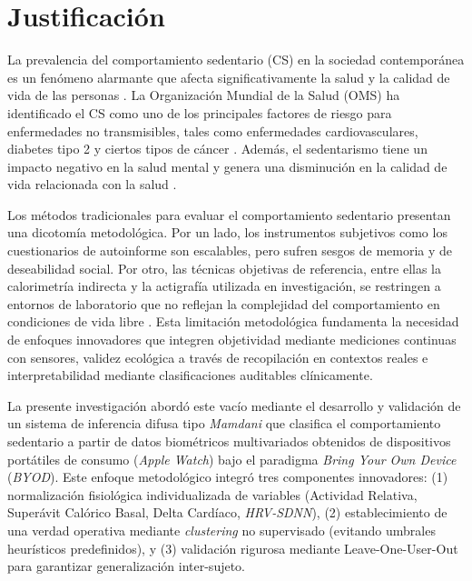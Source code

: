 \chapter{Justificación}
\label{chap:justificacion}

\noindent La prevalencia del comportamiento sedentario (CS) en la sociedad contemporánea es un fenómeno alarmante que afecta significativamente la salud y la calidad de vida de las personas \cite{Guthold2020,Swinburn2019Syndemic}. La Organización Mundial de la Salud (OMS) ha identificado el CS como uno de los principales factores de riesgo para enfermedades no transmisibles, tales como enfermedades cardiovasculares, diabetes tipo 2 y ciertos tipos de cáncer \cite{DiPietro2020Advancing,Murray2020GBD,Okunogbe2021Economic,WHO2009GlobalRisks}. Además, el sedentarismo tiene un impacto negativo en la salud mental y genera una disminución en la calidad de vida relacionada con la salud \cite{DiPietro2020Advancing,Guthold2020,Swinburn2019Syndemic}.

Los métodos tradicionales para evaluar el comportamiento sedentario presentan una dicotomía metodológica. Por un lado, los instrumentos subjetivos como los cuestionarios de autoinforme son escalables, pero sufren sesgos de memoria y de deseabilidad social. Por otro, las técnicas objetivas de referencia, entre ellas la calorimetría indirecta y la actigrafía utilizada en investigación, se restringen a entornos de laboratorio que no reflejan la complejidad del comportamiento en condiciones de vida libre \cite{Healy2024,Prince2008,Migueles2022GRANADA}. Esta limitación metodológica fundamenta la necesidad de enfoques innovadores que integren objetividad mediante mediciones continuas con sensores, validez ecológica a través de recopilación en contextos reales e interpretabilidad mediante clasificaciones auditables clínicamente.

La presente investigación abordó este vacío mediante el desarrollo y validación de un sistema de inferencia difusa tipo \textit{Mamdani} que clasifica el comportamiento sedentario a partir de datos biométricos multivariados obtenidos de dispositivos portátiles de consumo (\textit{Apple Watch}) bajo el paradigma \textit{Bring Your Own Device} (\textit{BYOD}). Este enfoque metodológico integró tres componentes innovadores: (1) normalización fisiológica individualizada de variables (Actividad Relativa, Superávit Calórico Basal, Delta Cardíaco, \textit{HRV-SDNN}), (2) establecimiento de una verdad operativa mediante \textit{clustering} no supervisado (evitando umbrales heurísticos predefinidos), y (3) validación rigurosa mediante Leave-One-User-Out para garantizar generalización inter-sujeto.

